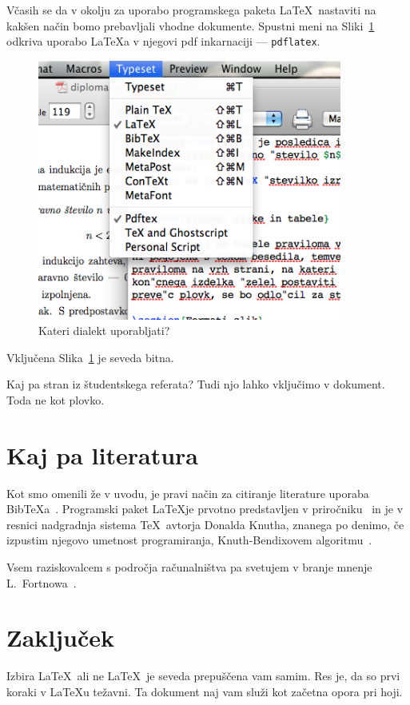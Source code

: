 \documentclass[a4paper, 12pt]{book}
\newcommand{\BibTeX}{{\sc Bib}\TeX}
\begin{document}
Včasih se da v okolju za uporabo programskega paketa \LaTeX\ nastaviti na kakšen način bomo prebavljali vhodne dokumente. Spustni meni na Sliki~\ref{pic2} odkriva uporabo \LaTeX{}a v njegovi pdf inkarnaciji --- {\tt pdflatex}.
\begin{figure}
\begin{center}
\includegraphics[width=10cm]{pic2.png}
\end{center}
\caption{Kateri dialekt uporabljati?}
\label{pic2}
\end{figure} 

Vključena Slika~\ref{pic2} je seveda bitna.

Kaj pa stran iz študentskega referata?\label{pp}
Tudi njo lahko vključimo v dokument. Toda ne kot plovko.
 


\chapter{Kaj pa literatura}
\label{ch3}
Kot smo omenili že v uvodu, je pravi način za citiranje literature uporaba \BibTeX{}a~\cite{bib}. 
Programski paket \LaTeX je prvotno predstavljen v priročniku~\cite{lat} in je v resnici nadgradnja sistema \TeX\ avtorja Donalda Knutha, znanega po denimo, če izpustim njegovo umetnost programiranja, Knuth-Bendixovem algoritmu~\cite{dk1}.

Vsem raziskovalcem s področja računalništva pa svetujem v branje mnenje L.\ Fortnowa~\cite{lf}.

\chapter{Zaključek}
Izbira \LaTeX\ ali ne \LaTeX\ je seveda prepuščena vam samim. Res je, da so prvi koraki v \LaTeX{}u težavni. Ta dokument naj vam služi kot začetna opora pri hoji.
\end{document}
